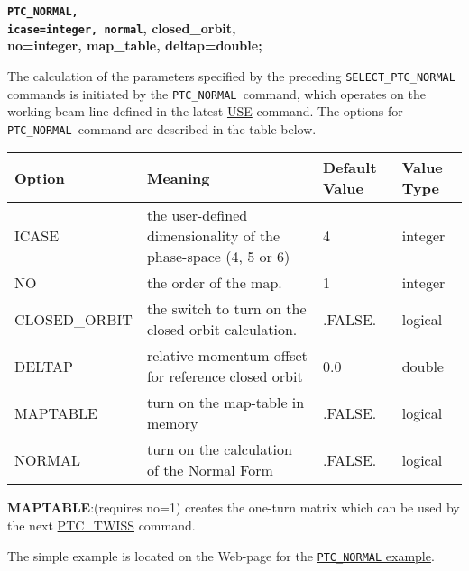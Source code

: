 \begin{description}
    \item {\texttt{\textbf{\textbf{PTC\_NORMAL, 
            \\   icase=}integer, }}\textbf{\texttt{normal}, \textbf{closed\_orbit}, \textbf{
          \\   no}=integer,         \textbf{map\_table, deltap}=double\textbf{;}}}

    \item[Description] 
      The calculation of the parameters specified by the preceding
      \texttt{SELECT\_PTC\_NORMAL } commands is initiated by the
      \texttt{PTC\_NORMAL }command, which operates on the working beam
      line defined in the latest \href{../control/general.html#use}{
        USE} command. The options for \texttt{PTC\_NORMAL }command are
      described in the table below.  

    \item[Options]
      \begin{tabular}{l p{5cm} p{2cm} p{2cm}}
        \hline 
        \textbf{Option} & \textbf{Meaning} & \textbf{Default Value} & \textbf{Value Type} \\ 
        \hline
        ICASE & the user-defined dimensionality of the phase-space (4, 5 or 6) & 4 & integer \\ 
        \hline
        NO & the order of the map. & 1 & integer \\ 
        \hline
        CLOSED\_ORBIT & the switch to turn on the closed orbit calculation. & .FALSE. & logical \\ 
        \hline
        DELTAP & relative momentum offset for reference closed orbit & 0.0 & double \\ 
        \hline
        MAPTABLE & turn on the map-table in memory & .FALSE. & logical \\ 
        \hline
        NORMAL & turn on the calculation of the Normal Form & .FALSE. & logical \\ 
        \hline
      \end{tabular}

    \item[Remarks] 
      \textbf{MAPTABLE}:\nolinebreak(requires no=1) creates the
      one-turn matrix which can be used by the next
      \href{../ptc_twiss/ptc_twiss.html}{PTC\_TWISS} command. 

    \item[Example]
      The simple example is located on the Web-page for the
      \href{http://cern.ch/frs/mad-X_examples/ptc_normal}{\texttt{PTC\_NORMAL}
        example}. 
\end{description}


